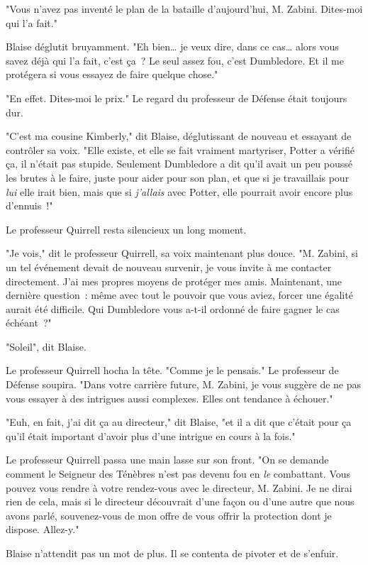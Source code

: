"Vous n'avez pas inventé le plan de la bataille d'aujourd'hui, M. Zabini. Dites-moi qui l'a fait."

Blaise déglutit bruyamment. "Eh bien… je veux dire, dans ce cas… alors vous savez déjà qui l'a fait, c'est ça~? Le seul assez fou, c'est Dumbledore. Et il me protégera si vous essayez de faire quelque chose."

"En effet. Dites-moi le prix." Le regard du professeur de Défense était toujours dur.

"C'est ma cousine Kimberly," dit Blaise, déglutissant de nouveau et essayant de contrôler sa voix. "Elle existe, et elle se fait vraiment martyriser, Potter a vérifié ça, il n'était pas stupide. Seulement Dumbledore a dit qu'il avait un peu poussé les brutes à le faire, juste pour aider pour son plan, et que si je travaillais pour \emph{lui} elle irait bien, mais que si \emph{j'allais} avec Potter, elle pourrait avoir encore plus d'ennuis~!"

Le professeur Quirrell resta silencieux un long moment.

"Je vois," dit le professeur Quirrell, sa voix maintenant plus douce. "M. Zabini, si un tel événement devait de nouveau survenir, je vous invite à me contacter directement. J'ai mes propres moyens de protéger mes amis. Maintenant, une dernière question~: même avec tout le pouvoir que vous aviez, forcer une égalité aurait été difficile. Qui Dumbledore vous a-t-il ordonné de faire gagner le cas échéant~?"

"Soleil", dit Blaise.

Le professeur Quirrell hocha la tête. "Comme je le pensais." Le professeur de Défense soupira. "Dans votre carrière future, M. Zabini, je vous suggère de ne pas vous essayer à des intrigues aussi complexes. Elles ont tendance à échouer."

"Euh, en fait, j'ai dit ça au directeur," dit Blaise, "et il a dit que c'était pour ça qu'il était important d'avoir plus d'une intrigue en cours à la fois."

Le professeur Quirrell passa une main lasse sur son front. "On se demande comment le Seigneur des Ténèbres n'est pas devenu fou en \emph{le} combattant. Vous pouvez vous rendre à votre rendez-vous avec le directeur, M. Zabini. Je ne dirai rien de cela, mais si le directeur découvrait d'une façon ou d'une autre que nous avons parlé, souvenez-vous de mon offre de vous offrir la protection dont je dispose. Allez-y."

Blaise n'attendit pas un mot de plus. Il se contenta de pivoter et de s'enfuir.

